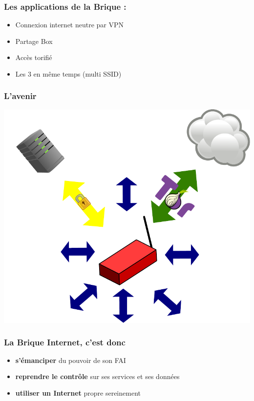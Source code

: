 \documentclass[notes=hide]{beamer}
\newcommand{\good}{{\color{green}\Smiley}}
\begin{document}
\begin{frame}[t]
\frametitle{\textcolor{titre}{Les applications de la Brique :}}
\vfill
\begin{center}
\begin{itemize}
    \item Connexion internet neutre par VPN
    \item Partage Box
    \item Accès torifié
	 \item Les 3 en même temps (multi SSID) \good
\end{itemize}
\end{center}
\end{frame}

\begin{frame}[t]
\frametitle{\textcolor{titre}{L'avenir}}
\vfill
\begin{center}
\includegraphics[scale=0.5]{img2/ultimate.pdf}
\end{center}
\end{frame}

\begin{frame}[t]
\frametitle{\textcolor{titre}{La Brique Internet, c'est donc}}
\vfill
\begin{itemize}
\item \textbf{s'émanciper} du pouvoir de son FAI \vfill
\item \textbf{reprendre le contrôle} sur ses services et ses données \vfill
\item \textbf{utiliser un Internet} propre sereinement
\end{itemize}
\vfill
\end{frame}
\end{document}
